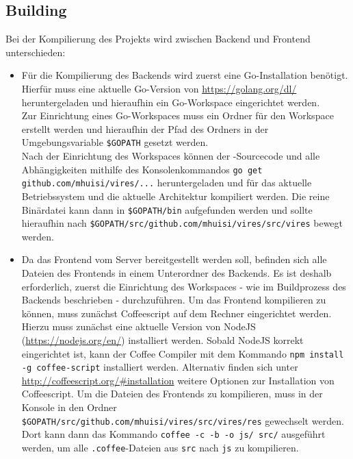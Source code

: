 \subsection{Building}
Bei der Kompilierung des Projekts wird zwischen Backend und Frontend unterschieden:
\begin{itemize}
	\item Für die Kompilierung des Backends wird zuerst eine Go-Installation benötigt.\\
	Hierfür muss eine aktuelle Go-Version von \url{https://golang.org/dl/} heruntergeladen und hieraufhin ein Go-Workspace eingerichtet werden.\\
	Zur Einrichtung eines Go-Workspaces muss ein Ordner für den Workspace erstellt werden und hieraufhin der Pfad des Ordners in der Umgebungsvariable 
	\verb+$GOPATH+ gesetzt werden.\\
	Nach der Einrichtung des Workspaces können der \vires-Sourcecode und alle Abhängigkeiten mithilfe des Konsolenkommandos
	\verb+go get github.com/mhuisi/vires/...+ heruntergeladen und für das aktuelle Betriebssystem und die aktuelle Architektur kompiliert werden. 
	Die reine Binärdatei kann dann in \verb+$GOPATH/bin+ aufgefunden werden und sollte hieraufhin nach
	\verb+$GOPATH/src/github.com/mhuisi/vires/src/vires+ bewegt werden.
	\item Da das Frontend vom Server bereitgestellt werden soll, befinden sich alle Dateien des Frontends in einem Unterordner des Backends. Es ist deshalb erforderlich, zuerst die Einrichtung des Workspaces - wie im Buildprozess des Backends beschrieben - durchzuführen.
	Um das Frontend kompilieren zu können, muss zunächst Coffeescript auf dem Rechner eingerichtet werden. Hierzu muss zunächst eine aktuelle Version von NodeJS (\url{https://nodejs.org/en/}) installiert werden. Sobald NodeJS korrekt eingerichtet ist, kann der Coffee Compiler mit dem Kommando \verb+npm install -g coffee-script+ installiert werden. Alternativ finden sich unter \url{http://coffeescript.org/\#installation} weitere Optionen zur Installation von Coffeescript.
	Um die Dateien des Frontends zu kompilieren, muss in der Konsole in den Ordner \verb+$GOPATH/src/github.com/mhuisi/vires/src/vires/res+ gewechselt werden. Dort kann dann das Kommando \verb+coffee -c -b -o js/ src/+ ausgeführt werden, um alle \verb+.coffee+-Dateien aus \verb+src+ nach \verb+js+ zu kompilieren.
\end{itemize}